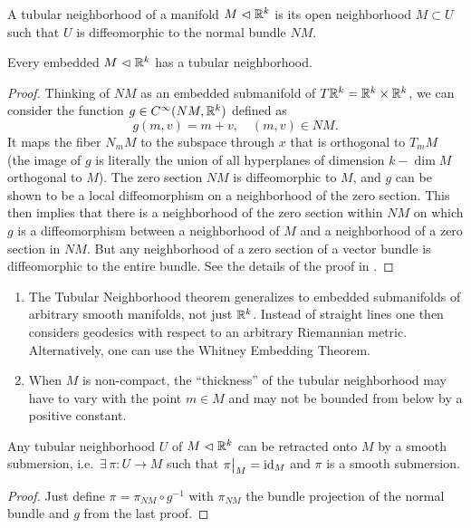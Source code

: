 \begin{defn}
    A tubular neighborhood of a manifold $M\vartriangleleft \mathbb{R}^k$ is its open neighborhood $M\subset U$ such that $U$ is diffeomorphic to the normal bundle $NM$.
\end{defn}

\begin{thm}\label{thm tubular neighb}
    Every embedded $M\vartriangleleft \mathbb{R}^k$ has a tubular neighborhood.
\end{thm}
\begin{proof}
    Thinking of $NM$ as an embedded submanifold of $T\mathbb{R}^k=\mathbb{R}^k\times\mathbb{R}^k$, we can consider the function $g\in C^\infty(NM,\mathbb{R}^k)$ defined as
    \[
        g(m,v)=m+v,\quad (m,v)\in NM.
    \]
    It maps the fiber $N_m M$ to the subspace through $x$ that is orthogonal to $T_m M$ (the image of $g$ is literally the union of all hyperplanes of dimension $k-\dim M$ orthogonal to $M$).
    The zero section $NM$ is diffeomorphic to $M$, and $g$ can be shown to be a local diffeomorphism on a neighborhood of the zero section. This then implies that there is a neighborhood of the zero section within $NM$ on which $g$ is a diffeomorphism between a neighborhood of $M$ and a neighborhood of a zero section in $NM$. But any neighborhood of a zero section of a vector bundle is diffeomorphic to the entire bundle. See the details of the proof in \cite[Thm.~6.24]{Lee}.
\end{proof}

\begin{rem}
\begin{enumerate}
    \item The Tubular Neighborhood theorem generalizes to embedded submanifolds of arbitrary smooth manifolds, not just $\mathbb{R}^k$. Instead of straight lines one then considers geodesics with respect to an arbitrary Riemannian metric. Alternatively, one can use the Whitney Embedding Theorem. 
    \item When $M$ is non-compact, the ``thickness'' of the tubular neighborhood may have to vary with the point $m\in M$ and may not be bounded from below by a positive constant.
\end{enumerate}
\end{rem}

\begin{thm}
    Any tubular neighborhood $U$ of $M\vartriangleleft\mathbb{R}^k$ can be retracted onto $M$ by a smooth submersion, i.e.\ $\exists\, \pi:U\to M$ such that $\restr{\pi}{M}=\id_M$ and $\pi$ is a smooth submersion.
\end{thm}
\begin{proof}
    Just define $\pi= \pi_{NM}\circ g^{-1}$ with $\pi_{NM}$ the bundle projection of the normal bundle and $g$ from the last proof.
\end{proof}

